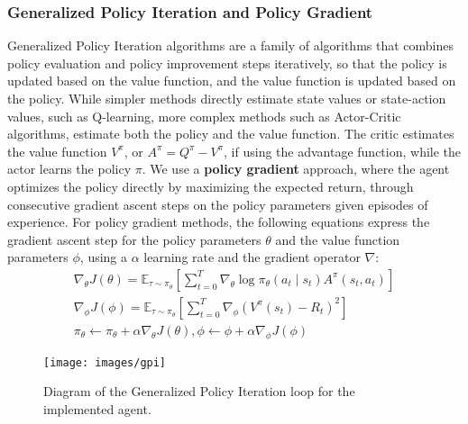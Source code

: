 \subsubsection{Generalized Policy Iteration and Policy Gradient}
\label{subsubsec:gpi}
Generalized Policy Iteration algorithms are a family of algorithms that combines policy evaluation and policy improvement steps iteratively,
so that the policy is updated based on the value function, and the value function is updated based on the policy.
While simpler methods directly estimate state values or state-action values, such as Q-learning, more complex methods
such as Actor-Critic algorithms, estimate both the policy and the value function.
The critic estimates the value function $V^\pi$, or $A^{\pi} = Q^{\pi} - V^{\pi}$, if using the advantage function, while the actor learns the policy $\pi$.
We use a \textbf{policy gradient} approach, where the agent optimizes the policy directly by maximizing the expected return,
through consecutive gradient ascent steps on the policy parameters given episodes of experience.
For policy gradient methods, the following equations express the gradient ascent step for the
policy parameters $\theta$ and the value function parameters $\phi$, using a $\alpha$ learning rate and the gradient operator $\nabla$:
\begin{gather*}
    \nabla_{\theta} J(\theta) = \mathbb{E}_{\tau \sim \pi_{\theta}} \left[ \sum_{t=0}^{T} \nabla_{\theta} \log \pi_{\theta}(a_t \mid s_t) A^{\pi}(s_t, a_t) \right]\\
    \nabla_{\phi} J(\phi) = \mathbb{E}_{\tau \sim \pi_{\theta}} \left[ \sum_{t=0}^{T} \nabla_{\phi} \left( V^{\pi}(s_t) - R_t \right)^2 \right]\\
    \pi_{\theta} \leftarrow \pi_{\theta} + \alpha \nabla_{\theta} J(\theta), \phi \leftarrow \phi + \alpha \nabla_{\phi} J(\phi)
\end{gather*}
\begin{figure}
    \centering
    \texttt{[image: images/gpi]}
    \caption{Diagram of the Generalized Policy Iteration loop for the implemented agent.}
    \label{fig:gpi}
\end{figure}

